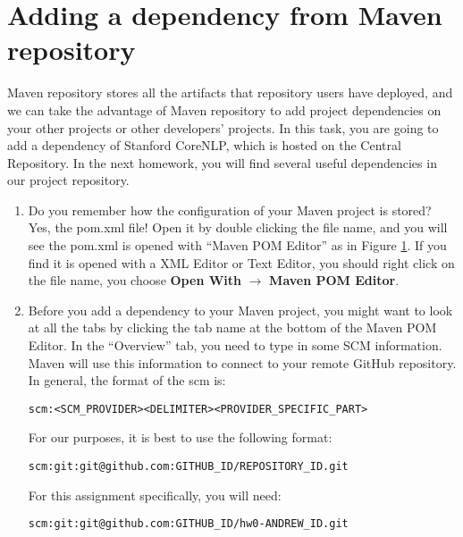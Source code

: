 \section{Adding a dependency from Maven repository}
\label{AddedDepFromMaven}

Maven repository stores all the artifacts that repository users have deployed,
and we can take the advantage of Maven repository to add project dependencies on
your other projects or other developers' projects. In this task, you are going
to add a dependency of Stanford CoreNLP, which is hosted on the Central
Repository. In the next homework, you will find several useful dependencies in
our project repository.

\begin{enumerate}
 
\begin{figure}[t]
\centering
\texttt{[image: repo-01-pom]}
\caption{Opening a POM file\label{repo-01-pom}}
\end{figure}

\item Do you remember how the configuration of your Maven project is stored?
Yes, the pom.xml file! Open it by double clicking the file name, and you will
see the pom.xml is opened with ``Maven POM Editor'' as in Figure
\ref{repo-01-pom}. If you find it is opened with a XML Editor or Text Editor,
you should right click on the file name, you choose \textbf{Open With}
$\rightarrow$ \textbf{Maven POM Editor}.

\item Before you add a dependency to your Maven project, you might want to look
at all the tabs by clicking the tab name at the bottom of the Maven POM Editor.
In the ``Overview'' tab, you need to type in some SCM information. Maven will
use this information to connect to your remote GitHub repository. In general,
the format of the scm is:

\begin{verbatim}
scm:<SCM_PROVIDER><DELIMITER><PROVIDER_SPECIFIC_PART>
\end{verbatim}

For our purposes, it is best to use the following format:

\begin{verbatim}
scm:git:git@github.com:GITHUB_ID/REPOSITORY_ID.git
\end{verbatim}

For this assignment specifically, you will need:
\begin{verbatim}
scm:git:git@github.com:GITHUB_ID/hw0-ANDREW_ID.git
\end{verbatim}


\end{enumerate}
